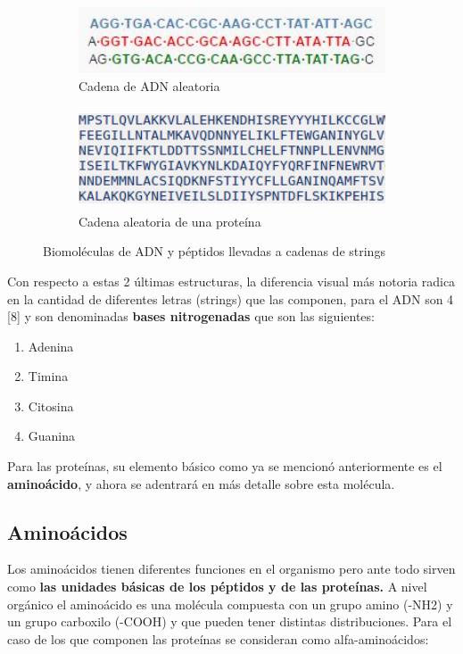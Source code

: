\begin{figure}[H]

\begin{subfigure}{0.5\textwidth}
\includegraphics[width=1\linewidth, height=2cm]{./images/adnejemplo}
\caption{Cadena de ADN aleatoria}
\label{fig:subim4}
\end{subfigure}
\begin{subfigure}{0.4\textwidth}
\includegraphics[width=1\linewidth, height=3cm]{./images/cadenaproteina} 
\caption{Cadena aleatoria de una proteína}
\label{fig:subim3}
\end{subfigure}
 
\caption{Biomoléculas de ADN y péptidos llevadas a cadenas de strings}
\label{fig:image2}
\end{figure}

Con respecto a estas 2 últimas estructuras, la diferencia visual más notoria radica en la cantidad de diferentes letras (strings) que las componen, para el ADN son 4 [8] y son denominadas \textbf{bases nitrogenadas} que son las siguientes:

\begin{enumerate}
\item Adenina
\item Timina
\item Citosina
\item Guanina
\end{enumerate}

Para las proteínas, su elemento básico como ya se mencionó anteriormente es el \textbf{aminoácido}, y ahora se adentrará en más detalle sobre esta molécula.

\subsection{Aminoácidos}

Los aminoácidos tienen diferentes funciones en el organismo \cite{amino} pero ante todo sirven como \textbf{las unidades básicas de los péptidos y de las proteínas.} A nivel orgánico el aminoácido es una molécula compuesta con un grupo amino (-NH2) y un grupo carboxilo (-COOH) y que pueden tener distintas distribuciones. Para el caso de los que componen las proteínas se consideran como alfa-aminoácidos:

